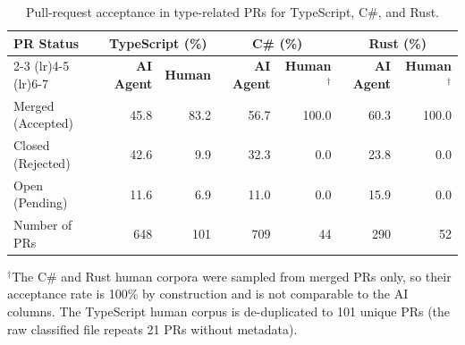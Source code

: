 %
%

\begin{table}[!t]
\caption{Pull-request acceptance in type-related PRs for TypeScript, C\#, and Rust.}
\centering
\small
\renewcommand{\arraystretch}{0.87}
\begin{tabular*}{\textwidth}{@{\extracolsep{\fill}}lrrrrrr@{}}
\toprule
\multirow{2.5}{*}{\textbf{PR Status}} & \multicolumn{2}{c}{\textbf{TypeScript (\%)}} & \multicolumn{2}{c}{\textbf{C\# (\%)}} & \multicolumn{2}{c}{\textbf{Rust (\%)}} \\
\cmidrule(lr){2-3} \cmidrule(lr){4-5} \cmidrule(lr){6-7}
 & \textbf{AI Agent} & \textbf{Human} & \textbf{AI Agent} & \textbf{Human}$^\dagger$ & \textbf{AI Agent} & \textbf{Human}$^\dagger$ \\
\midrule
Merged (Accepted)   & 45.8 &  83.2 & 56.7 & 100.0 & 60.3 & 100.0 \\
Closed (Rejected)   & 42.6 &   9.9 & 32.3 &   0.0 & 23.8 &   0.0 \\
Open (Pending)      & 11.6 &   6.9 & 11.0 &   0.0 & 15.9 &   0.0 \\
\midrule
Number of PRs       &  648 &   101 &  709 &    44 &  290 &    52 \\
\bottomrule
\end{tabular*}
\begin{minipage}{\textwidth}
\vspace{2pt}\footnotesize
$^\dagger$The C\# and Rust human corpora were sampled from merged PRs only, so their
acceptance rate is 100\% by construction and is not comparable to the AI columns.
The TypeScript human corpus is de-duplicated to 101 unique PRs (the raw classified
file repeats 21 PRs without metadata).
\end{minipage}
\label{tab:pr_rates}
\end{table}
